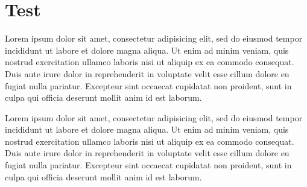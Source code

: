 \documentclass[10pt,a4paper,extrafontsizes,oldfontcommands,oneside]{memoir}
\begin{document}
\clearpage

\begin{hideshorttoc}

\printtoc

\end{hideshorttoc}

\clearpage

\listoffigures
\clearpage
\listoftables
\clearpage




\printglossary

\clearpage


\mainmatter

\chapter[Test TOC][Test Header]{Test} %
\label{chap:test}

Lorem ipsum dolor sit amet, consectetur adipisicing elit, sed do eiusmod tempor incididunt ut labore et dolore magna aliqua. Ut enim ad minim veniam, quis nostrud exercitation ullamco laboris nisi ut aliquip ex ea commodo consequat. Duis aute irure dolor in reprehenderit in voluptate velit esse cillum dolore eu fugiat nulla pariatur. Excepteur sint occaecat cupidatat non proident, sunt in culpa qui officia deserunt mollit anim id est laborum.

Lorem ipsum dolor sit amet, consectetur adipisicing elit, sed do eiusmod tempor incididunt ut labore et dolore magna aliqua. Ut enim ad minim veniam, quis nostrud exercitation ullamco laboris nisi ut aliquip ex ea commodo consequat. Duis aute irure dolor in reprehenderit in voluptate velit esse cillum dolore eu fugiat nulla pariatur. Excepteur sint occaecat cupidatat non proident, sunt in culpa qui officia deserunt mollit anim id est laborum.
\end{document}
